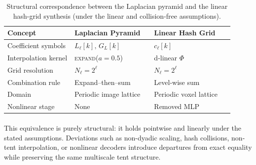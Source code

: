 \documentclass[a4paper,11pt,oneside]{article}
\numberwithin{equation}{section}
\begin{document}
\begin{table}[h]
\centering
\renewcommand{\arraystretch}{1.15} %
\setlength{\tabcolsep}{10pt}       %
\caption{Structural correspondence between the Laplacian pyramid and
the linear hash-grid synthesis (under the linear and collision-free assumptions).}
\vspace{0.5em}
\begin{tabular}{
    >{\raggedright\arraybackslash}p{0.27\linewidth}
    >{\centering\arraybackslash}p{0.32\linewidth}
    >{\centering\arraybackslash}p{0.32\linewidth}}
\toprule
\textbf{Concept} & \textbf{Laplacian Pyramid} & \textbf{Linear Hash Grid} \\ 
\midrule
Coefficient symbols & $L_\ell[k],\,G_L[k]$ & $c_\ell[k]$ \\
Interpolation kernel & \textsc{expand}($a{=}0.5$) & d-linear $\Phi$ \\
Grid resolution & $N_\ell = 2^\ell$ & $N_\ell = 2^\ell$ \\
Combination rule & Expand–then–sum & Level-wise sum \\
Domain & Periodic image lattice & Periodic voxel lattice \\
Nonlinear stage & None & Removed MLP \\
\bottomrule
\end{tabular}
\label{tab:structural_correspondence}
\end{table}


\paragraph{}
This equivalence is purely structural: it holds pointwise and linearly under the stated assumptions. Deviations such as non-dyadic scaling, hash collisions, non-tent interpolation, or nonlinear decoders introduce departures from exact equality while preserving the same multiscale tent structure.
\end{document}
